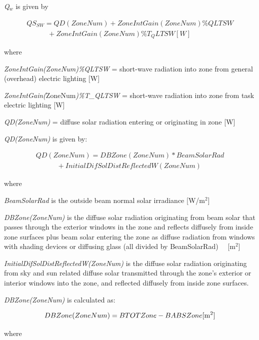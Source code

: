 \emph{Q\(_{w}\)} is given by

\begin{equation}
\begin{array}{l}
Q{S_{SW}} = QD(ZoneNum) + ZoneIntGain(ZoneNum)\% QLTSW \\
\quad \quad \quad + ZoneIntGain(ZoneNum)\% T_QLTSW [W]
\end{array}
\end{equation}

where

\emph{ZoneIntGain(ZoneNum)\%QLTSW} = short-wave radiation into zone from general (overhead) electric lighting {[}W{]}

\emph{ZoneIntGain(}ZoneNum\emph{)\%T\_QLTSW} = short-wave radiation into zone from task electric lighting {[}W{]}

\emph{QD(ZoneNum)} = diffuse solar radiation entering or originating in zone {[}W{]}

\emph{QD(ZoneNum)} is given by:

\begin{equation}
\begin{array}{l}
QD(ZoneNum) = DBZone(ZoneNum)*BeamSolarRad \\
\quad \quad \quad + InitialDifSolDistReflectedW(ZoneNum)
\end{array}
\end{equation}

where

\emph{BeamSolarRad} is the outside beam normal solar irradiance {[}W/m\(^{2}\){]}

\emph{DBZone(ZoneNum)} is the diffuse solar radiation originating from beam solar that passes through the exterior windows in the zone and reflects diffusely from inside zone surfaces plus beam solar entering the zone as diffuse radiation from windows with shading devices or diffusing glass (all divided by BeamSolarRad)~~ {[}m\(^{2}\){]}

\emph{InitialDifSolDistReflectedW(ZoneNum)} is the diffuse solar radiation originating from sky and sun related diffuse solar transmitted through the zone's exterior or interior windows into the zone, and reflected diffusely from inside zone surfaces.

\emph{DBZone(ZoneNum)} is calculated as:

\begin{equation}
DBZone(ZoneNum) = BTOTZone - BABSZone{\rm{    [}}{{\rm{m}}^{\rm{2}}}]
\end{equation}

where

